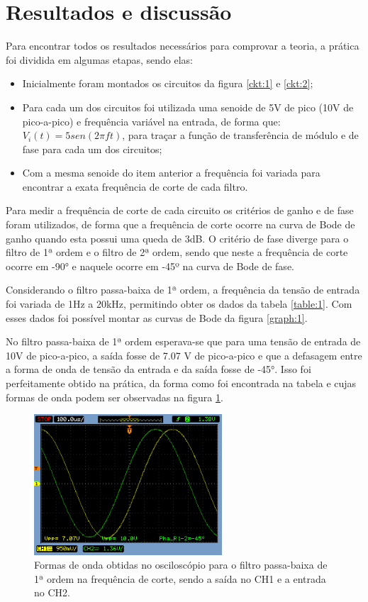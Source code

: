 \section{Resultados e discussão}

Para encontrar todos os resultados necessários para comprovar a teoria, a prática foi dividida em algumas etapas, sendo elas:


\begin{itemize}

    \item Inicialmente foram montados os circuitos da figura \ref{ckt:1} e \ref{ckt:2};
    
    \item Para cada um dos circuitos foi utilizada uma senoide de 5V de pico (10V de pico-a-pico) e frequência variável na entrada, de forma que: $V_i(t) = 5sen(2\pi f t)$, para traçar a função de transferência de módulo e de fase para cada um dos circuitos;
    
    \item Com a mesma senoide do item anterior a frequência foi variada para encontrar a exata frequência de corte de cada filtro.
\end{itemize}

Para medir a frequência de corte de cada circuito os critérios de ganho e de fase foram utilizados, de forma que a frequência de corte ocorre na curva de Bode de ganho quando esta possui uma queda de 3dB. O critério de fase diverge para o filtro de 1ª ordem e o filtro de 2ª ordem, sendo que neste a frequência de corte ocorre em -90° e naquele ocorre em -45º na curva de Bode de fase.

Considerando o filtro passa-baixa de 1ª ordem, a frequência da tensão de entrada foi variada de 1Hz a 20kHz, permitindo obter os dados da tabela \ref{table:1}. Com esses dados foi possível montar as curvas de Bode da figura \ref{graph:1}. 



No filtro passa-baixa de 1ª ordem esperava-se que para uma tensão de entrada de 10V de pico-a-pico, a saída fosse de 7.07 V de pico-a-pico e que a defasagem entre a forma de onda de tensão da entrada e da saída fosse de -45°. Isso foi perfeitamente obtido na prática, da forma como foi encontrada na tabela e cujas formas de onda podem ser observadas na figura \ref{fo1}.

\begin{figure}[H] 
\centering
\includegraphics[width=7cm]{images/f0_1.png}
\caption{Formas de onda obtidas no osciloscópio para o filtro passa-baixa de 1ª ordem na frequência de corte, sendo a saída no CH1 e a entrada no CH2.}
\label{fo1} 
\end{figure}

